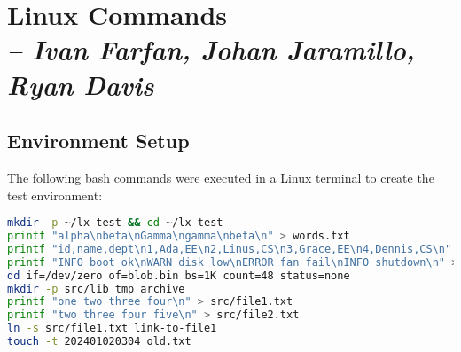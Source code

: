 \chapter{Linux Commands \\
\small{\textit{-- Ivan Farfan, Johan Jaramillo, Ryan Davis}}}
\label{chap:linux}

\section*{Environment Setup}
The following bash commands were executed in a Linux terminal to create the test environment:

\begin{lstlisting}[language=bash]
mkdir -p ~/lx-test && cd ~/lx-test
printf "alpha\nbeta\nGamma\ngamma\nbeta\n" > words.txt
printf "id,name,dept\n1,Ada,EE\n2,Linus,CS\n3,Grace,EE\n4,Dennis,CS\n" > people.csv
printf "INFO boot ok\nWARN disk low\nERROR fan fail\nINFO shutdown\n" > sys.log
dd if=/dev/zero of=blob.bin bs=1K count=48 status=none
mkdir -p src/lib tmp archive
printf "one two three four\n" > src/file1.txt
printf "two three four five\n" > src/file2.txt
ln -s src/file1.txt link-to-file1
touch -t 202401020304 old.txt
\end{lstlisting}

